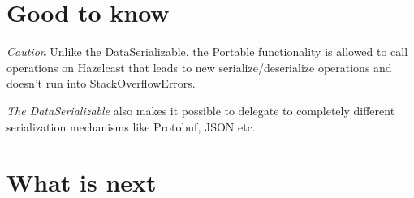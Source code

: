 \section{Good to know}

\emph{Caution}  Unlike the DataSerializable, the Portable functionality is allowed to call operations on Hazelcast that leads to new serialize/deserialize operations and doesn't run into StackOverflowErrors.

\emph{The DataSerializable} also makes it possible to delegate to completely different serialization mechanisms like Protobuf, JSON etc.

\section{What is next}
